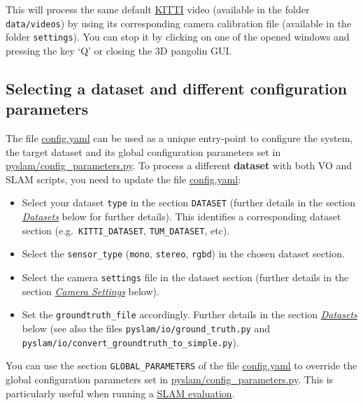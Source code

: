 \documentclass{article}
\begin{document}
This will process the same default
\href{http://www.cvlibs.net/datasets/kitti/eval_odometry.php}{KITTI}
video (available in the folder \texttt{data/videos}) by using its
corresponding camera calibration file (available in the folder
\texttt{settings}). You can stop it by clicking on one of the
opened windows and pressing the key `Q' or closing the 3D pangolin GUI.
\hypertarget{selecting-a-dataset-and-different-configuration-parameters}{%
\subsection{Selecting a dataset and different configuration
parameters}\label{selecting-a-dataset-and-different-configuration-parameters}}

The file \href{https://github.com/luigifreda/pyslam/blob/master/config.yaml}{config.yaml} can be used as a unique
entry-point to configure the system, the target dataset and its global
configuration parameters set in
\href{https://github.com/luigifreda/pyslam/blob/master/pyslam/config_parameters.py}{pyslam/config\_parameters.py}.
To process a different \textbf{dataset} with both VO and SLAM scripts,
you need to update the file \href{https://github.com/luigifreda/pyslam/blob/master/config.yaml}{config.yaml}:
\begin{itemize}
\item Select
your dataset \texttt{type} in the section \texttt{DATASET} (further
details in the section \emph{\protect\hyperlink{datasets}{Datasets}}
below for further details). This identifies a corresponding dataset
section (e.g.~\texttt{KITTI\_DATASET}, \texttt{TUM\_DATASET}, etc). 
\item  Select the \texttt{sensor\_type} (\texttt{mono}, \texttt{stereo},
\texttt{rgbd}) in the chosen dataset section.
\item  Select the camera \texttt{settings} file in the dataset section
(further details in the section
\emph{\protect\hyperlink{camera-settings}{Camera Settings}} below).
\item Set the \texttt{groundtruth\_file} accordingly. Further details in the
section \emph{\protect\hyperlink{datasets}{Datasets}} below (see also
the files \texttt{pyslam/io/ground\_truth.py} and
\texttt{pyslam/io/convert\_groundtruth\_to\_simple.py}).
\end{itemize}

You can use the section \texttt{GLOBAL\_PARAMETERS} of the file
\href{https://github.com/luigifreda/pyslam/blob/master/config.yaml}{config.yaml} to override the global configuration
parameters set in \href{https://github.com/luigifreda/pyslam/blob/master/pyslam/config_parameters.py}{pyslam/config\_parameters.py}.
This is particularly useful when running a
\protect\hyperlink{evaluating-slam}{SLAM evaluation}.
\end{document}
